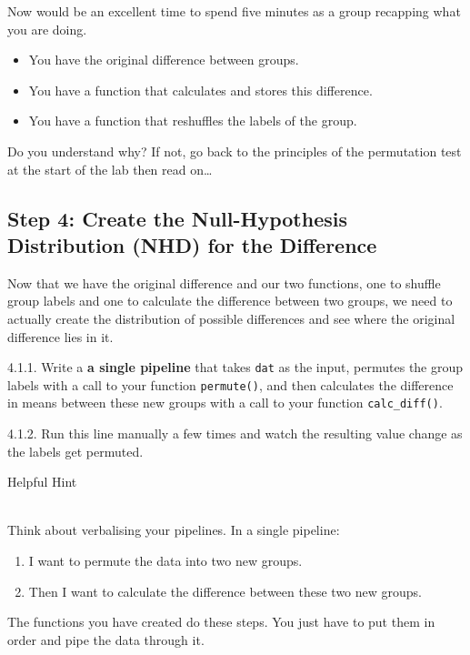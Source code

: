 \documentclass[]{book}
\providecommand{\tightlist}{%
  \setlength{\itemsep}{0pt}\setlength{\parskip}{0pt}}
\newenvironment{info}
    {
    \hline\\
    }
    { 
    \\\\\hline
    }
\begin{document}
Now would be an excellent time to spend five minutes as a group recapping what you are doing.

\begin{itemize}
\tightlist
\item
  You have the original difference between groups.
\item
  You have a function that calculates and stores this difference.
\item
  You have a function that reshuffles the labels of the group.
\end{itemize}

Do you understand why? If not, go back to the principles of the permutation test at the start of the lab then read on\ldots{}

\hypertarget{Ch5InClassQueT4}{%
\subsection{Step 4: Create the Null-Hypothesis Distribution (NHD) for the Difference}\label{Ch5InClassQueT4}}

Now that we have the original difference and our two functions, one to shuffle group labels and one to calculate the difference between two groups, we need to actually create the distribution of possible differences and see where the original difference lies in it.

4.1.1. Write a \textbf{a single pipeline} that takes \texttt{dat} as the input, permutes the group labels with a call to your function \texttt{permute()}, and then calculates the difference in means between these new groups with a call to your function \texttt{calc\_diff()}.

4.1.2. Run this line manually a few times and watch the resulting value change as the labels get permuted.

Helpful Hint

\begin{info}
Think about verbalising your pipelines. In a single pipeline:

\begin{enumerate}
.{enumi{enumi}.}
\tightlist
\item
  I want to permute the data into two new groups.
\item
  Then I want to calculate the difference between these two new groups.
\end{enumerate}

The functions you have created do these steps. You just have to put them
in order and pipe the data through it.
\end{info}
\end{document}
